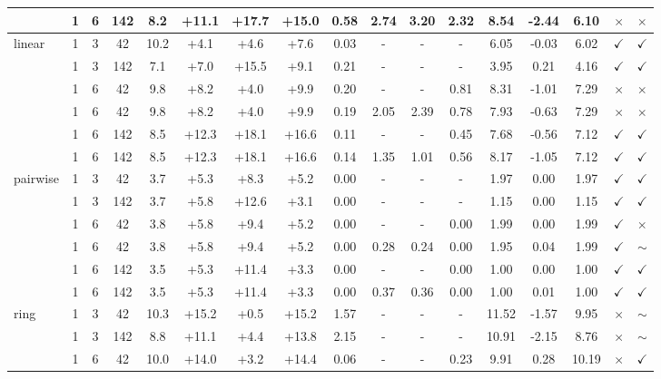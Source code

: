 \documentclass[
    reprint,
    amsmath, amssymb,
    aps,
    floatfix,
    nofootinbib
]{revtex4-1}
\begin{document}
\begin{table}[h!]
{\begin{tabular}{l|cc|c|c|ccc|cccc|ccc|cc}
 & 1 & 6 & 142 & 8.2 & +11.1 & +17.7 & +15.0 & 0.58 & 2.74 & 3.20 & 2.32 & 8.54 & -2.44 & 6.10 & $\times$ & $\times$ \\
\midrule
\hline
\multirow{6}{*}{linear} & 1 & 3 & 42 & 10.2 & +4.1 & +4.6 & +7.6 & 0.03 & - & - & - & 6.05 & -0.03 & 6.02 & $\checkmark$ & $\checkmark$ \\
 & 1 & 3 & 142 & 7.1 & +7.0 & +15.5 & +9.1 & 0.21 & - & - & - & 3.95 & 0.21 & 4.16 & $\checkmark$ & $\checkmark$ \\
 & 1 & 6 & 42 & 9.8 & +8.2 & +4.0 & +9.9 & 0.20 & - & - & 0.81 & 8.31 & -1.01 & 7.29 & $\times$ & $\times$ \\
 & 1 & 6 & 42 & 9.8 & +8.2 & +4.0 & +9.9 & 0.19 & 2.05 & 2.39 & 0.78 & 7.93 & -0.63 & 7.29 & $\times$ & $\times$ \\
 & 1 & 6 & 142 & 8.5 & +12.3 & +18.1 & +16.6 & 0.11 & - & - & 0.45 & 7.68 & -0.56 & 7.12 & $\checkmark$ & $\checkmark$ \\
 & 1 & 6 & 142 & 8.5 & +12.3 & +18.1 & +16.6 & 0.14 & 1.35 & 1.01 & 0.56 & 8.17 & -1.05 & 7.12 & $\checkmark$ & $\checkmark$ \\
\midrule
\hline
\multirow{6}{*}{pairwise} & 1 & 3 & 42 & 3.7 & +5.3 & +8.3 & +5.2 & 0.00 & - & - & - & 1.97 & 0.00 & 1.97 & $\checkmark$ & $\checkmark$ \\
 & 1 & 3 & 142 & 3.7 & +5.8 & +12.6 & +3.1 & 0.00 & - & - & - & 1.15 & 0.00 & 1.15 & $\checkmark$ & $\checkmark$ \\
 & 1 & 6 & 42 & 3.8 & +5.8 & +9.4 & +5.2 & 0.00 & - &- & 0.00 & 1.99 & 0.00 & 1.99 & $\checkmark$ & $\times$ \\
 & 1 & 6 & 42 & 3.8 & +5.8 & +9.4 & +5.2 & 0.00 & 0.28 & 0.24 & 0.00 & 1.95 & 0.04 & 1.99 & $\checkmark$ & $\sim$ \\
 & 1 & 6 & 142 & 3.5 & +5.3 & +11.4 & +3.3 & 0.00 & - & - & 0.00 & 1.00 & 0.00 & 1.00 & $\checkmark$ & $\checkmark$ \\
 & 1 & 6 & 142 & 3.5 & +5.3 & +11.4 & +3.3 & 0.00 & 0.37 & 0.36 & 0.00 & 1.00 & 0.01 & 1.00 & $\checkmark$ & $\checkmark$ \\
\midrule
\hline
\multirow{6}{*}{ring} & 1 & 3 & 42 & 10.3 & +15.2 & +0.5 & +15.2 & 1.57 & - & - & - & 11.52 & -1.57 & 9.95 & $\times$ & $\sim$ \\
 & 1 & 3 & 142 & 8.8 & +11.1 & +4.4 & +13.8 & 2.15 & - & - & - & 10.91 & -2.15 & 8.76 & $\times$ & $\sim$ \\
 & 1 & 6 & 42 & 10.0 & +14.0 & +3.2 & +14.4 & 0.06 & - & - & 0.23 & 9.91 & 0.28 & 10.19 & $\times$ & $\checkmark$ \\

\end{tabular}}
\end{table}
\end{document}
